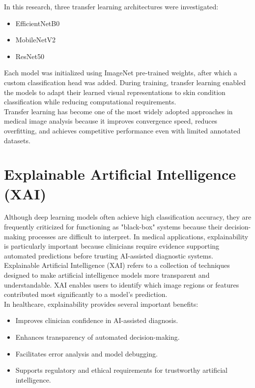 In this research, three transfer learning architectures were investigated:
\begin{itemize}
    \item EfficientNetB0
    \item MobileNetV2
    \item ResNet50
\end{itemize}

Each model was initialized using ImageNet pre-trained weights, after which a custom classification head was added. During training, transfer learning enabled the models to adapt their learned visual representations to skin condition classification while reducing computational requirements.\\
Transfer learning has become one of the most widely adopted approaches in medical image analysis because it improves convergence speed, reduces overfitting, and achieves competitive performance even with limited annotated datasets.

\section{Explainable Artificial Intelligence (XAI)}
Although deep learning models often achieve high classification accuracy, they are frequently criticized for functioning as "black-box" systems because their decision-making processes are difficult to interpret. In medical applications, explainability is particularly important because clinicians require evidence supporting automated predictions before trusting AI-assisted diagnostic systems.\\
Explainable Artificial Intelligence (XAI) refers to a collection of techniques designed to make artificial intelligence models more transparent and understandable. XAI enables users to identify which image regions or features contributed most significantly to a model's prediction.\\

In healthcare, explainability provides several important benefits:
\begin{itemize}
    \item Improves clinician confidence in AI-assisted diagnosis.
    \item Enhances transparency of automated decision-making.
    \item Facilitates error analysis and model debugging.
    \item Supports regulatory and ethical requirements for trustworthy artificial intelligence.
\end{itemize}

